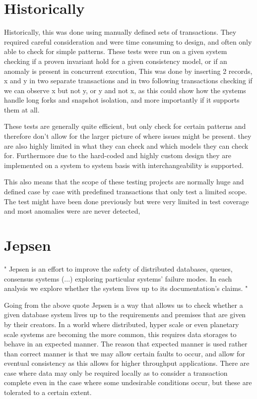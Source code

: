 \documentclass[a4paper,10pt,titlepage]{report}
\begin{document}
\section{Historically}

Historically, this was done using manually defined sets of transactions. They required careful consideration and were time consuming to design, and often only able to check for simple patterns.  These tests were run on a given system checking if a proven invariant hold for a given consistency model, or if an anomaly is present in concurrent execution, This was done by inserting 2 records,  x and y in two separate transactions and in two following transactions checking if we can observe x but not y, or y and not x, as this could show how the systems handle long forks and snapshot isolation, and more importantly if it supports them at all.

These tests are generally quite efficient, but only check for certain patterns and therefore don't allow for the larger picture of where issues might be present. they are also highly limited in what they can check and which models they can check for. Furthermore due to the hard-coded and highly custom design they are implemented on a system to system basis with interchangeability is supported.

This also means that the scope of these testing projects are normally huge and defined case by case with predefined transactions that only test a limited scope. The test might have been done previously but were very limited in test coverage and most anomalies were are never detected,

\section{Jepsen}
"
Jepsen is an effort to improve the safety of distributed databases, queues, consensus systems  (...) exploring particular systems' failure modes. In each analysis we explore whether the system lives up to its documentation's claims.
"\cite{jepsonio}
\\
\vspace{5mm}

Going from the above quote Jepsen is a way that allows us to check whether a given database system lives up to the requirements and premises that are given by their creators. In a world where distributed, hyper scale or even planetary scale systems are becoming the more common, this requires data storages to behave in an expected manner. The reason that expected manner is used rather than correct manner is that we may allow certain faults to occur, and allow for eventual consistency as this allows for higher throughput applications. There are case where data may only be required locally as to consider a transaction complete even in the case where some undesirable conditions occur, but these are tolerated to a certain extent. \\
\vspace{5mm}
\end{document}
